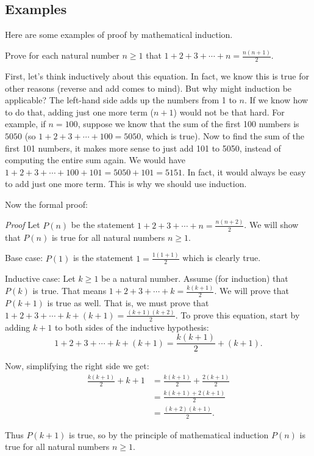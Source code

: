 \documentclass[11pt,]{book}
\makeatletter
\theoremstyle{ptxplainnotitle}
\theoremstyle{ptxplaintitle}
\renewcommand*{\proofname}{Proof}
\renewenvironment{proof}[1][\proofname]{\par
  \pushQED{\qed}%
  \normalfont \topsep6\p@\@plus6\p@\relax
  \trivlist
  \item\relax
    {\itshape
    #1\@addpunct{.}}\hspace\labelsep\ignorespaces
}{%
  \popQED\endtrivlist\@endpefalse
}
\theoremstyle{ptxdefinitionnotitle}
\theoremstyle{ptxdefinitiontitle}
\theoremstyle{ptxdefinitionnotitle}
\theoremstyle{ptxdefinitiontitle}
\theoremstyle{ptxdefinitionnotitle}
\theoremstyle{ptxdefinitiontitle}
\theoremstyle{ptxdefinitiontitlenonumber}
\theoremstyle{ptxdefinitiontitlenonumber}
\numberwithin{equation}{chapter}
\newcommand{\amp}{&}
\makeatother
\begin{document}
\subsection[{Examples}]{Examples}\label{subsec_induction-examples}
\hypertarget{p-553}{}%
Here are some examples of proof by mathematical induction.%
\begin{example}\label{example-25}
\hypertarget{p-554}{}%
Prove for each natural number \(n \ge 1\) that \(1 + 2 + 3 + \cdots + n = \frac{n(n+1)}{2}\).%
\par\smallskip%
\noindent\textbf{}\hypertarget{solution-83}{}\hypertarget{p-555}{}%
First, let's think inductively about this equation. In fact, we know this is true for other reasons (reverse and add comes to mind). But why might induction be applicable? The left-hand side adds up the numbers from 1 to \(n\). If we know how to do that, adding just one more term (\(n+1\)) would not be that hard. For example, if \(n = 100\), suppose we know that the sum of the first 100 numbers is \(5050\) (so \(1 + 2 + 3 + \cdots + 100 = 5050\), which is true). Now to find the sum of the first 101 numbers, it makes more sense to just add 101 to 5050, instead of computing the entire sum again. We would have \(1 + 2 + 3 + \cdots + 100 + 101 = 5050 + 101 = 5151\). In fact, it would always be easy to add just one more term. This is why we should use induction.%
\par
\hypertarget{p-556}{}%
Now the formal proof:%
\begin{proof}\hypertarget{proof-2}{}
\hypertarget{p-557}{}%
Let \(P(n)\) be the statement \(1 + 2 + 3 + \cdots + n = \frac{n(n+2)}{2}\). We will show that \(P(n)\) is true for all natural numbers \(n \ge 1\).%
\par
\hypertarget{p-558}{}%
Base case: \(P(1)\) is the statement \(1 = \frac{1(1+1)}{2}\) which is clearly true.%
\par
\hypertarget{p-559}{}%
Inductive case: Let \(k \ge 1\) be a natural number. Assume (for induction) that \(P(k)\) is true. That means \(1 + 2 + 3 + \cdots + k = \frac{k(k+1)}{2}\). We will prove that \(P(k+1)\) is true as well. That is, we must prove that \(1 + 2 + 3 + \cdots + k + (k+1) = \frac{(k+1)(k+2)}{2}\). To prove this equation, start by adding \(k+1\) to both sides of the inductive hypothesis:%
\begin{equation*}
1 + 2 + 3 + \cdots + k + (k+1) = \frac{k(k+1)}{2} + (k+1).
\end{equation*}
%
\par
\hypertarget{p-560}{}%
Now, simplifying the right side we get:%
\begin{align*}
\frac{k(k+1)}{2} + k+1 \amp = \frac{k(k+1)}{2} + \frac{2(k+1)}{2}\\
\amp = \frac{k(k+1) + 2(k+1)}{2}\\
\amp = \frac{(k+2)(k+1)}{2}.
\end{align*}
%
\par
\hypertarget{p-561}{}%
Thus \(P(k+1)\) is true, so by the principle of mathematical induction \(P(n)\) is true for all natural numbers \(n \ge 1\).%
\end{proof}
\end{example}
\end{document}
